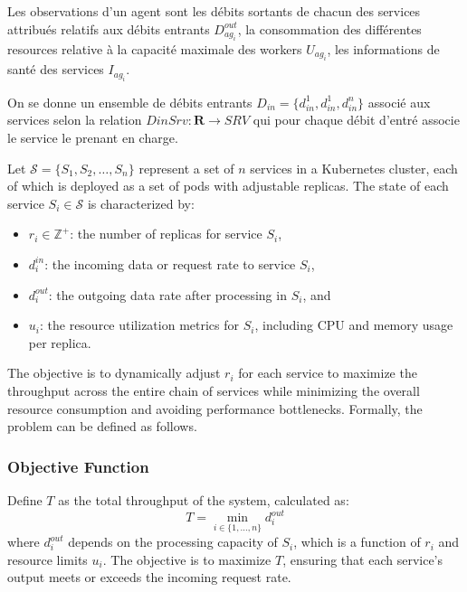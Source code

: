 \documentclass[conference]{IEEEtran}
\begin{document}
Les observations d'un agent sont les débits sortants de chacun des services attribués relatifs aux débits entrants $D^{out}_{ag_i}$, la consommation des différentes resources relative à la capacité maximale des workers $U_{ag_i}$, les informations de santé des services $I_{ag_i}$.

On se donne un ensemble de débits entrants $D_{in} = \{d_{in}^1, d_{in}^1, d_{in}^n\}$ associé aux services selon la relation $DinSrv: \mathbf{R} \rightarrow SRV$ qui pour chaque débit d'entré associe le service le prenant en charge.





Let $\mathcal{S} = \{S_1, S_2, \dots, S_n\}$ represent a set of $n$ services in a Kubernetes cluster, each of which is deployed as a set of pods with adjustable replicas. The state of each service $S_i \in \mathcal{S}$ is characterized by:
\begin{itemize}
    \item $\mathit{r_i} \in \mathbb{Z}^+$: the number of replicas for service $S_i$,
    \item $\mathit{d_i^{in}}$: the incoming data or request rate to service $S_i$,
    \item $\mathit{d_i^{out}}$: the outgoing data rate after processing in $S_i$, and
    \item $\mathit{u_i}$: the resource utilization metrics for $S_i$, including CPU and memory usage per replica.
\end{itemize}

The objective is to dynamically adjust $\mathit{r_i}$ for each service to maximize the throughput across the entire chain of services while minimizing the overall resource consumption and avoiding performance bottlenecks. Formally, the problem can be defined as follows.

\subsubsection{Objective Function}

Define $\mathit{T}$ as the total throughput of the system, calculated as:
\begin{equation}
    T = \min_{i \in \{1, \dots, n\}} d_i^{out}
\end{equation}
where $d_i^{out}$ depends on the processing capacity of $S_i$, which is a function of $\mathit{r_i}$ and resource limits $\mathit{u_i}$. The objective is to maximize $T$, ensuring that each service's output meets or exceeds the incoming request rate.
\end{document}
